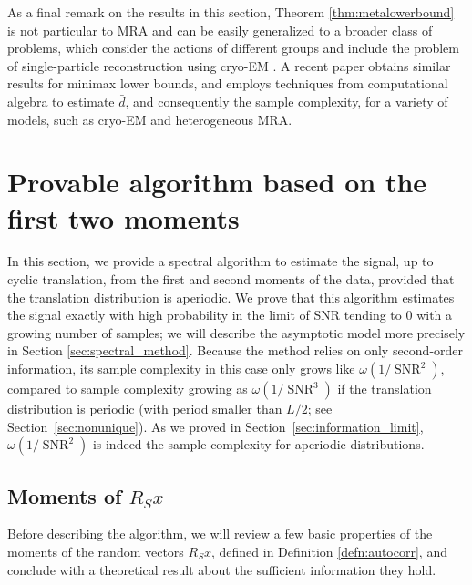 \documentclass{IEEEtran}
\numberwithin{equation}{section}
\numberwithin{figure}{section}
\theoremstyle{plain}
\theoremstyle{definition}
\theoremstyle{remark}
\theoremstyle{plain}
\theoremstyle{remark}
\theoremstyle{plain}
\theoremstyle{plain}
\theoremstyle{remark}
\newcommand{\SNR}{\operatorname{SNR}}
\begin{document}
As a final remark on the results in this section, Theorem \ref{thm:metalowerbound} is not particular to MRA and can be easily generalized to a broader class of problems, which consider the actions of different groups and include the problem of single-particle reconstruction using cryo-EM \cite{abbe2018estimation}. A recent paper \cite{bandeira2017optimal} obtains similar results for minimax lower bounds, and employs techniques from computational algebra to estimate $\bar d$, and consequently the sample complexity, for a variety of models, such as cryo-EM and heterogeneous MRA.


\section{Provable algorithm based on the first two moments} 
\label{sec:spectral_algorithm}

In this section, we provide a spectral algorithm to estimate the signal, up to cyclic translation, from the first and second moments of the data, provided that the translation distribution is aperiodic. We prove that this algorithm estimates the signal exactly with high probability in the limit of SNR tending to $0$ with a growing number of samples; we will describe the asymptotic model more precisely in Section \ref{sec:spectral_method}. Because the method relies on only second-order information, its sample complexity in this case only grows like $\omega(1/\SNR^2)$, compared to sample complexity growing as $\omega(1/\SNR^3)$ if the translation distribution is periodic (with period smaller than $L/2$; see Section~\ref{sec:nonunique}). As we proved in Section~\ref{sec:information_limit}, $\omega(1/\SNR^2)$ is indeed the sample complexity for aperiodic distributions.
 
\subsection{Moments of $R_S x$} \label{sec:moments}

Before describing the algorithm, we will review a few basic properties of the moments of the random vectors $R_S x$, defined in Definition \ref{defn:autocorr}, and conclude with a theoretical result about the sufficient information they hold. 
\end{document}
